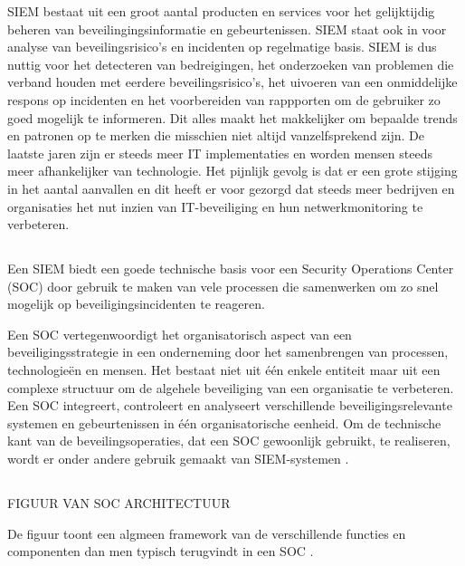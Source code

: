 SIEM bestaat uit een groot aantal producten en services voor het gelijktijdig beheren van beveilingingsinformatie en gebeurtenissen. SIEM staat ook in voor analyse van beveilingsrisico's en incidenten op regelmatige basis. SIEM is dus nuttig voor het detecteren van bedreigingen, het onderzoeken van problemen die verband houden met eerdere beveilingsrisico's, het uivoeren van een onmiddelijke respons op incidenten en het voorbereiden van rappporten om de gebruiker zo goed mogelijk te informeren. Dit alles maakt het makkelijker om bepaalde trends en patronen op te merken die misschien niet altijd vanzelfsprekend zijn. De laatste jaren zijn er steeds meer IT implementaties en worden mensen steeds meer afhankelijker van technologie. Het pijnlijk gevolg is dat er een grote stijging in het aantal aanvallen en dit heeft er voor gezorgd dat steeds meer bedrijven en organisaties het nut inzien van IT-beveiliging en hun netwerkmonitoring te verbeteren.

\subsection{}

Een SIEM biedt een goede technische basis voor een Security Operations Center (SOC) door gebruik te maken van vele processen die samenwerken om zo snel mogelijk op beveiligingsincidenten te reageren.

Een SOC vertegenwoordigt het organisatorisch aspect van een beveiligingsstrategie in een onderneming door het samenbrengen van processen, technologieën en mensen. Het bestaat niet uit één enkele entiteit maar uit een complexe structuur om de algehele beveiliging van een organisatie te verbeteren. Een SOC integreert, controleert en analyseert verschillende beveiligingsrelevante systemen en gebeurtenissen in één organisatorische eenheid. Om de technische kant van de beveilingsoperaties, dat een SOC gewoonlijk gebruikt, te realiseren, wordt er onder andere gebruik gemaakt van SIEM-systemen \autocite{Vielberth2021}. 

\subsection*{}

FIGUUR VAN SOC ARCHITECTUUR

De figuur toont een algmeen framework van de verschillende functies en componenten dan men typisch terugvindt in een SOC \autocite{Schinagl; Paas: Schoon, 2015}.

